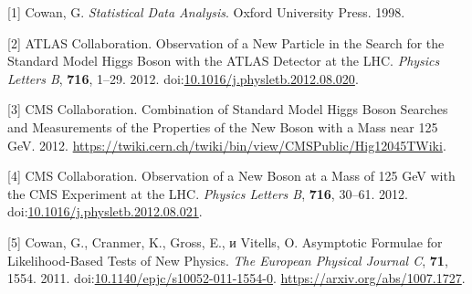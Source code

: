 \documentclass[
  russian,
  11pt,
  a4paper,
  open=any]{scrbook}
\newlength{\cslhangindent}
\newenvironment{CSLReferences}[2] %
 {\begin{list}{}{%
  \setlength{\itemindent}{0pt}
  \setlength{\leftmargin}{0pt}
  \setlength{\parsep}{0pt}
  \ifodd #1
   \setlength{\leftmargin}{\cslhangindent}
   \setlength{\itemindent}{-1\cslhangindent}
  \fi
  \setlength{\itemsep}{#2\baselineskip}}}
 {\end{list}}
\newif\ifbookpagenavigator
\newcommand{\NeutrinoHitBackCover}{%
  \clearpage
  \begingroup
  \ifdefined\bookpagenavigatorfalse\bookpagenavigatorfalse\fi
  \endgroup
}
\begin{document}
\protect{}\label{refs}
\begin{CSLReferences}{0}{0}
{[}1{]} Cowan, G. \emph{Statistical Data Analysis}. Oxford University
Press. 1998.

{[}2{]} ATLAS Collaboration. Observation of a New Particle in the Search
for the Standard Model Higgs Boson with the {ATLAS} Detector at the
{LHC}. \emph{Physics Letters B}, \textbf{716}, 1--29. 2012.
doi:\href{https://doi.org/10.1016/j.physletb.2012.08.020}{10.1016/j.physletb.2012.08.020}.

{[}3{]} CMS Collaboration. Combination of Standard Model Higgs Boson
Searches and Measurements of the Properties of the New Boson with a Mass
near 125 {GeV}. 2012.
\url{https://twiki.cern.ch/twiki/bin/view/CMSPublic/Hig12045TWiki}.

{[}4{]} CMS Collaboration. Observation of a New Boson at a Mass of 125
{GeV} with the {CMS} Experiment at the {LHC}. \emph{Physics Letters B},
\textbf{716}, 30--61. 2012.
doi:\href{https://doi.org/10.1016/j.physletb.2012.08.021}{10.1016/j.physletb.2012.08.021}.

{[}5{]} Cowan, G., Cranmer, K., Gross, E., и Vitells, O. Asymptotic
Formulae for Likelihood-Based Tests of New Physics. \emph{The European
Physical Journal C}, \textbf{71}, 1554. 2011.
doi:\href{https://doi.org/10.1140/epjc/s10052-011-1554-0}{10.1140/epjc/s10052-011-1554-0}.
\url{https://arxiv.org/abs/1007.1727}.

\end{CSLReferences}


\backmatter

\NeutrinoHitBackCover
\end{document}
